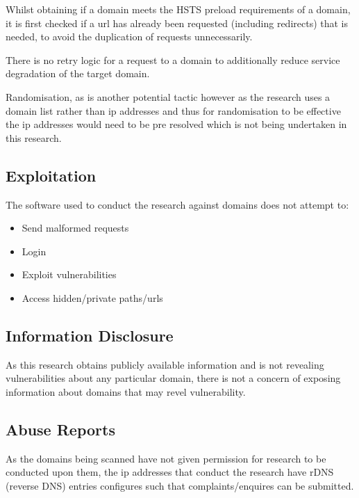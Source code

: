 \documentclass{mscreport}
\begin{document}
\vspace{0.3cm} \noindent
Whilst obtaining if a domain meets the HSTS preload requirements of a domain, it is first checked if a url has already been requested (including redirects) that is needed, to avoid the duplication of requests unnecessarily.

\vspace{0.3cm} \noindent
There is no retry logic for a request to a domain to additionally reduce service degradation of the target domain.

\vspace{0.3cm} \noindent
Randomisation, as  is another potential tactic however as the research uses a domain list rather than ip addresses and thus for randomisation to be effective the ip addresses would need to be pre resolved which is not being undertaken in this research.

\subsection{Exploitation}

The software used to conduct the research against domains does not attempt to:

\begin{itemize}
	\setlength\itemsep{0.1em}
    \item Send malformed requests
    \item Login
    \item Exploit vulnerabilities
    \item Access hidden/private paths/urls
\end{itemize}

\subsection{Information Disclosure}

As this research obtains publicly available information and is not revealing vulnerabilities about any particular domain, there is not a concern of exposing information about domains that may revel vulnerability.

\subsection{Abuse Reports}

As the domains being scanned have not given permission for research to be conducted upon them, the ip addresses that conduct the research have rDNS (reverse DNS) entries configures such that complaints/enquires can be submitted.
\end{document}
